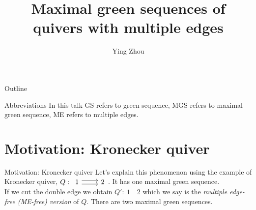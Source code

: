 \documentclass{beamer}
\title{Maximal green sequences of quivers with multiple edges}
\author{Ying Zhou\inst{1}}
\institute[Brandeis University] %
{
  \inst{1}%
  Department of Mathematics\\
  Brandeis University \and}
\begin{document}
\begin{frame}
  \titlepage
\end{frame}

\begin{frame}{Outline}
  \tableofcontents
\end{frame}

\begin{frame}{Abbreviations}
\indent In this talk GS refers to green sequence, MGS refers to maximal green sequence, ME refers to multiple edges.
\end{frame}

\section{Motivation: Kronecker quiver}
\begin{frame}[fragile]{Motivation: Kronecker quiver}
\indent Let's explain this phenomenon using the example of Kronecker quiver,  $Q:\,\begin{tikzcd}1\arrow[r, shift right=0.6ex]\arrow[r, shift left=0.6ex] & 2\end{tikzcd}$. It has one maximal green sequence.\\\pause
\indent If we cut the double edge we obtain $Q':\ 1\quad 2$ which we say is the \textit{multiple edge-free (ME-free) version} of $Q$. There are two maximal green sequences.\\
\end{frame}
\end{document}
